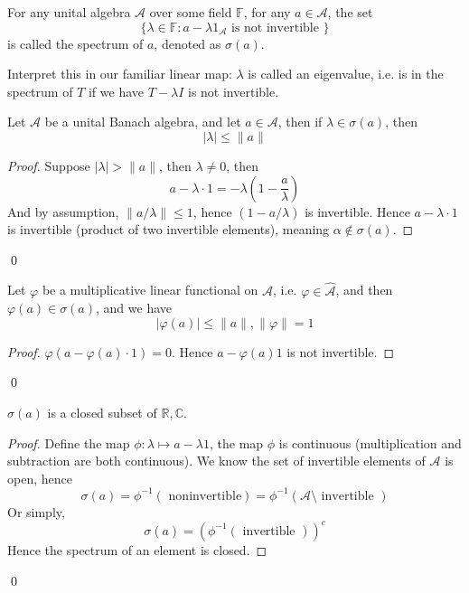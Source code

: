 \begin{definition}
    For any unital algebra $\mathcal{A}$ over some field $\mathbb{F}$, for any $a\in\mathcal{A}$, the set
    \begin{equation*}
        \{\lambda\in\mathbb{F}: a-\lambda 1_\mathcal{A}\text{ is not invertible }\}
    \end{equation*}
    is called the spectrum of $a$, denoted as $\sigma(a)$.
\end{definition}

Interpret this in our familiar linear map: $\lambda$ is called an eigenvalue, i.e. is in the spectrum of $T$ if we have $T-\lambda I$ is not invertible.

\begin{proposition}
    Let $\mathcal{A}$ be a unital Banach algebra, and let $a\in\mathcal{A}$, then if $\lambda\in\sigma(a)$, then
    \begin{equation*}
        |\lambda|\leq\|a\|
    \end{equation*}
\end{proposition}
\begin{proof}
    Suppose $|\lambda|>\|a\|$, then $\lambda\neq 0$, then
    \begin{equation*}
        a-\lambda\cdot 1=-\lambda(1-\frac{a}{\lambda})
    \end{equation*}
    And by assumption, $\|a/\lambda\|\leq 1$, hence $(1-a/\lambda)$ is invertible. Hence $a-\lambda\cdot 1$ is invertible (product of two invertible elements),  meaning $\alpha\not\in\sigma(a)$.
\end{proof}
\qed

\begin{proposition}
    Let $\varphi$ be a multiplicative linear functional on $\mathcal{A}$, i.e. $\varphi\in\widehat{\mathcal{A}}$, and then $\varphi(a)\in\sigma(a)$, and we have
    \begin{equation*}
        |\varphi(a)|\leq\|a\|, \|\varphi\|=1
    \end{equation*}
\end{proposition}
\begin{proof}
    $\varphi(a-\varphi(a)\cdot 1)=0$.
    Hence $a-\varphi(a)1$ is not invertible.
\end{proof}
\qed


\begin{proposition}
    $\sigma(a)$ is a closed subset of $\mathbb{R}, \mathbb{C}$.
\end{proposition}
\begin{proof}
    Define the map $\phi: \lambda\mapsto a-\lambda1$, the map $\phi$ is continuous (multiplication and subtraction are both continuous). We know the set of invertible elements of $\mathcal{A}$ is open, hence
    \begin{equation*}
        \sigma(a)=\phi^{-1}(\text{ noninvertible})=\phi^{-1}(\mathcal{A}\setminus\text{ invertible })
    \end{equation*}
    Or simply,
    \begin{equation*}
        \sigma(a)=(\phi^{-1}(\text{ invertible }))^c
    \end{equation*}
    Hence the spectrum of an element is closed.
\end{proof}
\qed


